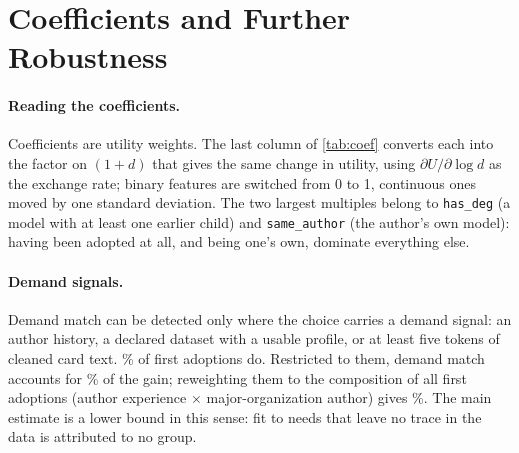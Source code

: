 \section{Coefficients and Further Robustness}
\label{app:robust}



\paragraph{Reading the coefficients.}
Coefficients are utility weights. The last column of \cref{tab:coef} converts each into the factor on $(1+d)$ that
gives the same change in utility, using $\partial U / \partial \log d$ as the exchange rate; binary features are
switched from 0 to 1, continuous ones moved by one standard deviation. The two largest multiples belong to
\texttt{has\_deg} (a model with at least one earlier child) and \texttt{same\_author} (the author's own model): having
been adopted at all, and being one's own, dominate everything else.

\paragraph{Demand signals.}
Demand match can be detected only where the choice carries a demand signal: an author history, a declared dataset
with a usable profile, or at least five tokens of cleaned card text. \sigShare\% of first adoptions do. Restricted to
them, demand match accounts for \sigMatch\% of the gain; reweighting them to the composition of all first adoptions
(author experience $\times$ major-organization author) gives \sigMatchRw\%. The main estimate is a lower bound in
this sense: fit to needs that leave no trace in the data is attributed to no group.
